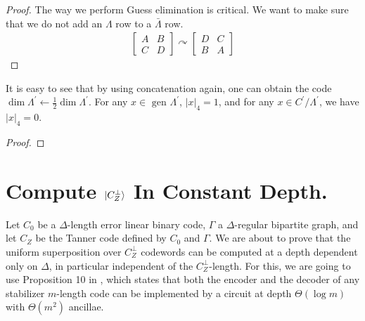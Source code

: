 \documentclass[manuscript,screen,review]{acmart}
\begin{document}
\begin{proof} 
  The way we perform Guess elimination is critical. We want to make sure that we do not add an $\Lambda$ row to a $\bar{\Lambda}$ row. 
  \begin{equation*}
    \begin{split}
      \begin{bmatrix}
        A & B \\ 
        C & D
      \end{bmatrix}	\curvearrowright \begin{bmatrix}
        D & C \\ 
        B & A
      \end{bmatrix}
    \end{split}
  \end{equation*}
\end{proof}


\begin{claim}
  It is easy to see that by using concatenation again, one can obtain the code $\dim \Lambda^{\prime} \leftarrow \frac{1}{2}\dim \Lambda^{\prime}$. For any $x \in \text{ gen } \Lambda^{\prime}$, $|x|_{4} = 1$, and for any $x \in C^{\prime} / \Lambda^{\prime}$, we have $|x|_{4} = 0$.
  \end{claim}

  \begin{proof}
  \end{proof}


  \section{Compute $\ket{C_{Z}^{\perp}}$ In Constant Depth.}
Let $C_{0}$ be a $\Delta$-length error linear binary code, $\Gamma$ a $\Delta$-regular bipartite graph, and let $C_{Z}$ be the Tanner code defined by $C_{0}$ and $\Gamma$. We are about to prove that the uniform superposition over $C_{Z}^\perp$ codewords can be computed at a depth dependent only on $\Delta$, in particular independent of the $C_{Z}^{\perp}$-length. For this, we are going to use Proposition 10 in \cite{moore1998parallel}, which states that both the encoder and the decoder of any stabilizer $m$-length code can be implemented by a circuit at depth $\Theta(\log m)$ with $\Theta(m^{2})$ ancillae.
\end{document}
